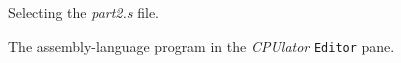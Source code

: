 \documentclass[epsfig,10pt,fullpage]{article}
\begin{document}
\begin{enumerate}
\begin{figure}[H]
	\begin{center}
    \setlength{\fboxsep}{0pt}
	\end{center}
	\caption{Selecting the {\it part2.s} file.}
\label{fig:open}
\end{figure}

\begin{figure}[H]
	\begin{center}
    \setlength{\fboxsep}{0pt}
	\end{center}
	\caption{The assembly-language program in the {\it CPUlator} \texttt{Editor} pane.}
\label{fig:editor}
\end{figure}


\end{enumerate}
\end{document}
